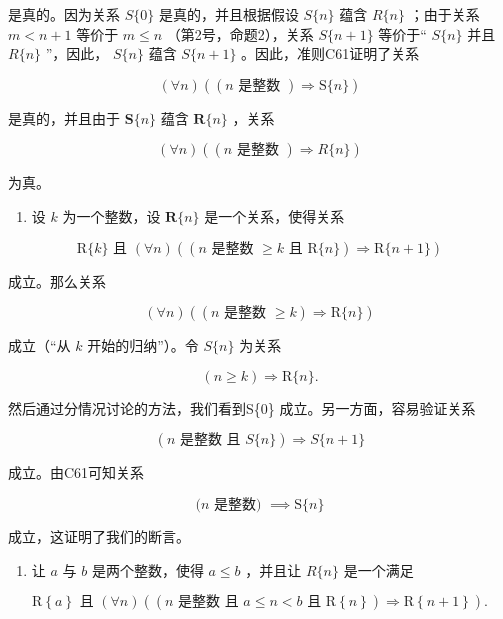 是真的。因为关系 \(S\{0\}\) 是真的，并且根据假设 \(S\{n\}\) 蕴含 \(R\{n\}\) ；由于关系 \(m < n + 1\) 等价于 \(m \leqslant n\) （第2号，命题2），关系 \(S\{n + 1\}\) 等价于“ \(S\{n\}\) 并且 \(R\{n\}\) ''，因此， \(S\{n\}\) 蕴含 \(S\{n + 1\}\) 。因此，准则C61证明了关系

\[
(\forall n) ((n \text {   是整数   }) \Longrightarrow \mathrm{S} \{n \})
\]

是真的，并且由于 \(\mathbf{S}\{n\}\) 蕴含 \(\mathbf{R}\{n\}\) ，关系

\[
(\forall n) ((n \text {   是整数   }) \Longrightarrow R \{n \})
\]

为真。

\begin{enumerate}
\def\labelenumi{(\arabic{enumi})}
\setcounter{enumi}{1}
\tightlist
\item
  设 \(k\) 为一个整数，设 \(\mathbf{R}\{n\}\) 是一个关系，使得关系
\end{enumerate}

\[
\mathrm{R} \{k \} \text { 且 } (\forall n) ((n \text { 是整数 } \geqslant k \text { 且 } \mathrm{R} \{n \}) \Longrightarrow \mathrm{R} \{n + 1 \})
\]

成立。那么关系

\[
(\forall n) ((n \text {   是整数   } \geqslant k) \Longrightarrow \mathrm{R} \{n \})
\]

成立（“从 \(k\) 开始的归纳”）。令 \(S\{n\}\) 为关系

\[
(n \geqslant k) \Longrightarrow \mathrm{R} \{n \}.
\]

然后通过分情况讨论的方法，我们看到S\{0\} 成立。另一方面，容易验证关系

\[
(n \text {   是整数   且   } S \{n \}) \Longrightarrow S \{n + 1 \}
\]

成立。由C61可知关系

\[
(n \text {   是整数) } \implies \mathrm{S} \{n \}
\]

成立，这证明了我们的断言。

\begin{enumerate}
\def\labelenumi{(\arabic{enumi})}
\setcounter{enumi}{2}
\tightlist
\item
  让 \(a\) 与 \(b\) 是两个整数，使得 \(a \leqslant b\) ，并且让 \(R\{n\}\) 是一个满足
\end{enumerate}

\[
\mathrm{R} \left\{a \right\} \text {   且   } (\forall n) ((n \text {   是整数   且   } a \leqslant n <   b \text {   且   } \mathrm{R} \left\{n \right\}) \Longrightarrow \mathrm{R} \left\{n + 1 \right\}).
\]


